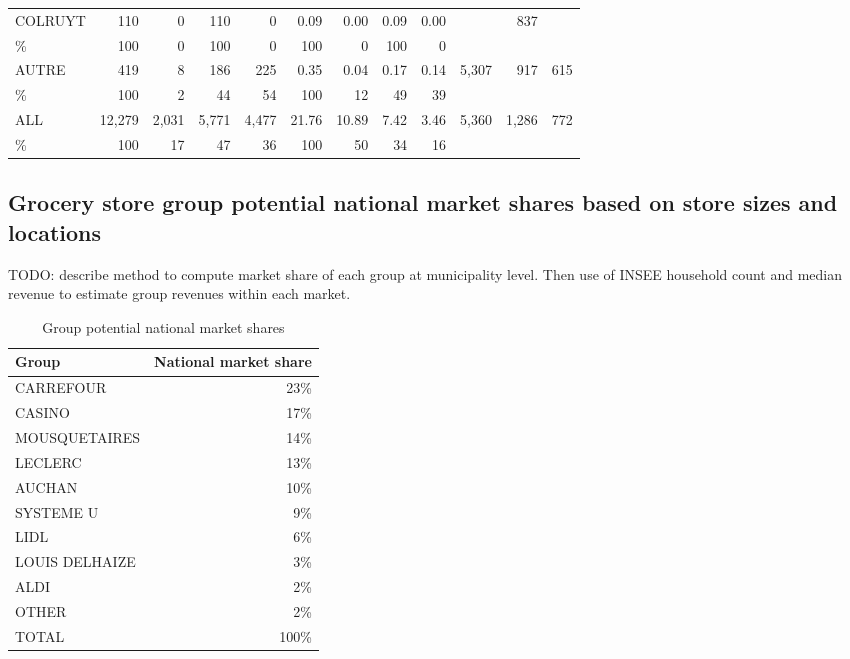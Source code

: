 \documentclass[11pt]{article}
\begin{document}
\begin{table}[H]
\begin{tabular}{l|rrrr|rrrr|rrr}
COLRUYT        &        110 &          0 &        110 &          0 &       0.09 &       0.00 &       0.09 &       0.00 &            &        837 &            \\
\%             &        100 &          0 &        100 &          0 &        100 &          0 &        100 &          0 &            &            &            \\
AUTRE          &        419 &          8 &        186 &        225 &       0.35 &       0.04 &       0.17 &       0.14 &      5,307 &        917 &        615 \\
\%             &        100 &          2 &         44 &         54 &        100 &         12 &         49 &         39 &            &            &            \\

\midrule
ALL            &     12,279 &      2,031 &      5,771 &      4,477 &      21.76 &      10.89 &       7.42 &       3.46 &      5,360 &      1,286 &        772 \\
\%             &        100 &         17 &         47 &         36 &        100 &         50 &         34 &         16 &            &            &            \\
\bottomrule
\end{tabular}

\end{table}

\subsection{Grocery store group potential national market shares based on store sizes and locations}

TODO: describe method to compute market share of each group at municipality level. Then use of INSEE household count and median revenue to estimate group revenues within each market.

\begin{table}[H]
\caption{Group potential national market shares}
\footnotesize
\setlength{\tabcolsep}{2pt}

\begin{tabular}{lr}
\toprule
\toprule
Group &          National market share \\
\midrule
CARREFOUR      &       23\% \\
CASINO         &       17\% \\
MOUSQUETAIRES  &       14\% \\
LECLERC        &       13\% \\
AUCHAN         &       10\% \\
SYSTEME U      &       9\% \\
LIDL           &       6\% \\
LOUIS DELHAIZE &       3\% \\
ALDI           &       2\% \\
OTHER & 2\% \\
\midrule
TOTAL & 100\% \\
\bottomrule
\end{tabular}

\end{table}
\end{document}
